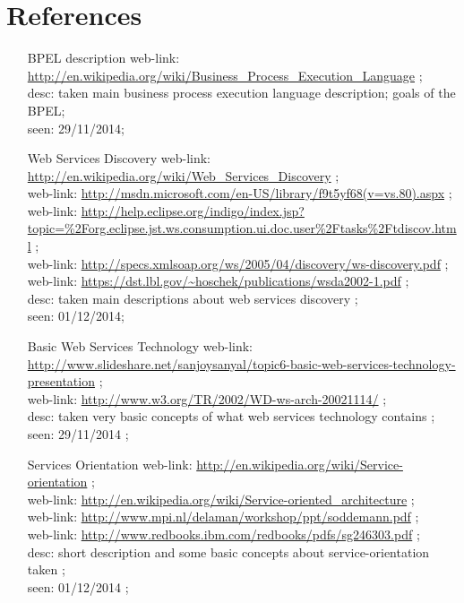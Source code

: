 \section{References}
\begin{enumerate}
\item [BPEL description] web-link: \url{http://en.wikipedia.org/wiki/Business_Process_Execution_Language} ; \\ desc: taken main business process execution language description; goals of the BPEL; \\ seen: 29/11/2014; \\
\item [Web Services Discovery] web-link: \url{http://en.wikipedia.org/wiki/Web_Services_Discovery} ; \\ 
web-link: \url{http://msdn.microsoft.com/en-US/library/f9t5yf68(v=vs.80).aspx} ; \\
web-link: \url{http://help.eclipse.org/indigo/index.jsp?topic=%2Forg.eclipse.jst.ws.consumption.ui.doc.user%2Ftasks%2Ftdiscov.html} ; \\ 
web-link: \url{http://specs.xmlsoap.org/ws/2005/04/discovery/ws-discovery.pdf} ; \\
web-link: \url{https://dst.lbl.gov/~hoschek/publications/wsda2002-1.pdf} ; \\
desc: taken main descriptions about web services discovery ; \\ seen: 01/12/2014; \\
\item [Basic Web Services Technology] web-link: \url{http://www.slideshare.net/sanjoysanyal/topic6-basic-web-services-technology-presentation} ; \\ 
web-link: \url{http://www.w3.org/TR/2002/WD-ws-arch-20021114/} ; \\ desc: taken very basic concepts of what web services technology contains ; \\ seen: 29/11/2014 ; \\
\item [Services Orientation] web-link: \url{http://en.wikipedia.org/wiki/Service-orientation} ; \\ 
web-link: \url{http://en.wikipedia.org/wiki/Service-oriented_architecture} ; \\ 
web-link: \url{http://www.mpi.nl/delaman/workshop/ppt/soddemann.pdf} ; \\ 
web-link: \url{http://www.redbooks.ibm.com/redbooks/pdfs/sg246303.pdf} ; \\ desc: short description and some basic concepts about service-orientation taken ; \\ seen: 01/12/2014 ; \\

\end{enumerate}

